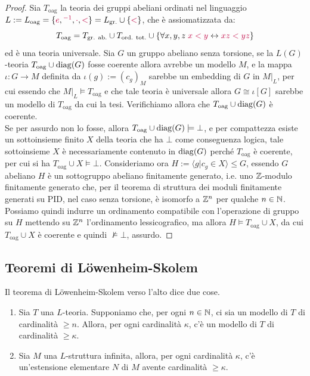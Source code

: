 \begin{proof}
    Sia $T_{\text{oag}}$ la teoria dei gruppi abeliani ordinati nel linguaggio $L := L_{\text{oag}} = \{\textcolor{purple}{e}, \textcolor{purple}{^{-1}}, \textcolor{purple}{\cdot}, \textcolor{purple}{<}\} = L_{\text{gr.}} \cup \{\textcolor{purple}{<}\}$, che è assiomatizzata da:
    \[ T_{\text{oag}} = T_{\text{gr. ab.}} \cup T_{\text{ord. tot.}} \cup \{\forall x,y,z \; \textcolor{purple}{x < y} \leftrightarrow \textcolor{purple}{xz < yz}\}
    \]
    ed è una teoria universale. Sia $G$ un gruppo abeliano senza torsione, se la $L(G)$-teoria $T_{\text{oag}} \cup \operatorname{diag}(G)$ fosse coerente allora avrebbe un modello $M$, e la mappa $\iota : G \to M$ definita da $\iota(g) := (c_g)_M$ sarebbe un embedding di $G$ in $M|_L$,
    per cui essendo che $M|_L \models T_{\text{oag}}$ e che tale teoria è universale allora $G \cong \iota[G]$ sarebbe un modello di $T_{\text{oag}}$ da cui la tesi.
    Verifichiamo allora che $T_{\text{oag}} \cup \operatorname{diag}(G)$ è coerente.\\
    Se per assurdo non lo fosse, allora $T_{\text{oag}} \cup \operatorname{diag}(G) \models \bot$, e per compattezza esiste un sottoinsieme finito $X$ della teoria che ha $\bot$ come conseguenza logica, tale 
    sottoinsieme $X$ è necessariamente contenuto in $\operatorname{diag}(G)$ perché $T_{\text{oag}}$ è coerente, per cui si ha $T_{\text{oag}} \cup X \models \bot$. Consideriamo ora $H := \langle  g | c_g \in X\rangle \leqslant G$, essendo $G$ abeliano $H$ è un sottogruppo abeliano finitamente generato,
    i.e. uno $\mathbb Z$-modulo finitamente generato che, per il teorema di struttura dei moduli finitamente generati su PID, nel caso senza torsione, è isomorfo a $\mathbb Z^n$ per qualche $n \in \mathbb N$. Possiamo quindi indurre un ordinamento compatibile con l'operazione di gruppo su $H$ mettendo su $\mathbb Z^n$ l'ordinamento lessicografico,
    ma allora $H \models T_{\text{oag}} \cup X$, da cui $T_{\text{oag}} \cup X$ è coerente e quindi $\not\models \bot$, assurdo.
\end{proof}
\pagebreak
\subsection{Teoremi di Löwenheim-Skolem}

\begin{theorem}
    Il teorema di Löwenheim-Skolem verso l'alto dice due cose.
    \begin{enumerate}
        \item Sia $T$ una $L$-teoria. Supponiamo che, per ogni $n \in \mathbb N$, ci sia un modello di $T$ di cardinalità $\geq n$. Allora, per ogni cardinalità $\kappa$, c'è un modello di $T$ di cardinalità $\geq \kappa$.
        \item Sia $M$ una $L$-struttura infinita, allora, per ogni cardinalità $\kappa$, c'è un'estensione elementare $N$ di $M$ avente cardinalità $\geq \kappa$.
    \end{enumerate}
\end{theorem}

